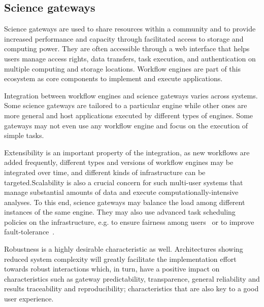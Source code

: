 \documentclass[preprint,3p,twocolumn]{elsarticle}
\newcommand{\note}[2]{\pdfmargincomment[color=yellow,author=#1,open=true]{#2}}
\newcommand{\closednote}[4]{} %
\begin{document}
\subsection{Science gateways}

Science gateways are used to share resources within a community and to
provide increased performance and capacity through facilitated access
to storage and computing power. They are often accessible through a
web interface that helps users manage access rights, data transfers,
task execution, and authentication on multiple computing and storage
locations. Workflow engines are part of this ecosystem as core
components to implement and execute applications.


Integration between workflow engines and science gateways varies
across systems. Some science gateways are tailored to a particular
engine while other ones are more general and host applications
executed by different types of engines. Some gateways may not even use any
workflow engine and focus on the execution of simple tasks.

Extensibility is an important property of the integration, as new
workflows are added frequently, different types and versions of
workflow engines may be integrated over time, and different kinds of
infrastructure can be targeted.Scalability is also a crucial concern
for such multi-user systems that manage substantial amounts of data
and execute computationally-intensive analyses. To this end, science
gateways may balance the load among different instances of the same
engine. They may also use advanced task scheduling policies on the
infrastructure, e.g. to ensure fairness among
users~\cite{FERR-14,CPE:CPE3708} or to improve
fault-tolerance~\cite{wilkins2008teragrid,FERR-13}.

Robustness is a highly desirable characteristic as well. Architectures
showing reduced system complexity will greatly facilitate the
implementation effort towards robust interactions which, in turn, have
a positive impact on characteristics such as gateway predictability,
transparence, general reliability and results traceability and
reproducibility; characteristics that are also key to a good user
experience. \closednote{Marc-Etienne}{I find that something is weak in
  this last paragraph. Robustness will help with transparency, sure,
  but it seems only a small facet.  Also, the text seem to timidly
  favor architectures with less components/interactions without much
  explanation... Complex systems can be robust, but at greater
  costs...  Here is one: "Architectures showing reduced system
  complexity will greatly facilitate the implementation effort towards
  robust interactions which, in turn, have a positive impact on
  characteristics such as gateway predictability, transparence,
  general reliability and results traceability and reproducibility;
  characteristics that are also key to a good user
  experience."}{Tristan}{Agreed, fixed as
  suggested.}\note{Tristan}{Work on the this sentence again.}
\end{document}
